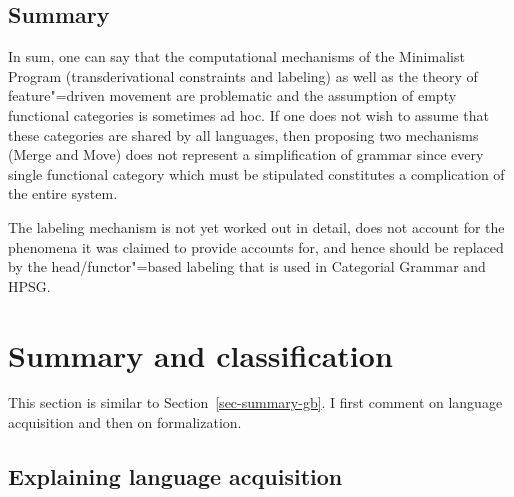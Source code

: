 \subsection{Summary}

In sum, one can say that the computational mechanisms of the Minimalist Program (\eg transderivational 
constraints and labeling) as well as the theory of
feature"=driven movement are problematic and the assumption of empty functional categories is sometimes ad hoc.
If one does not wish to assume that these categories are shared by all languages, then proposing two mechanisms (Merge
and Move) does not represent a simplification of grammar since every single functional category which must be stipulated
constitutes a complication of the entire system.

The labeling mechanism is not yet worked out in detail, does not account for the phenomena it was
claimed to provide accounts for, and hence should be replaced by the head/functor"=based
labeling that is used in Categorial Grammar and HPSG.



\section{Summary and classification}


This section is similar to Section~\ref{sec-summary-gb}. I first comment on language acquisition and
then on formalization.

\subsection{Explaining language acquisition}

